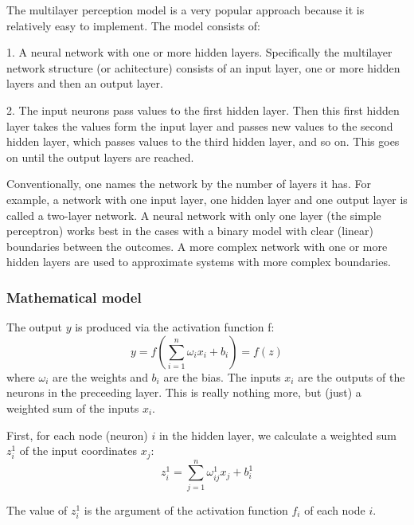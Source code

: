 \documentclass[a4paper,12pt]{article}
\begin{document}
The multilayer perception model is a very popular approach because it is relatively easy to implement. The model consists of:\newline

1. A neural network with one or more hidden layers. Specifically the multilayer network structure (or achitecture) consists of an input layer, one or more hidden layers and then an output layer.\newline

2. The input neurons pass values to the first hidden layer. Then this first hidden layer takes the values form the input layer and passes new values to the second hidden layer, which passes values to the third hidden layer, and so on. This goes on until the output layers are reached. \newline

Conventionally, one names the network by the number of layers it has. For example, a network with one input layer, one hidden layer and one output layer is called a two-layer network. A neural network with only one layer (the simple perceptron) works best in the cases with a binary model with clear (linear) boundaries between the outcomes. A more complex network with one or more hidden layers are used to approximate systems with more complex boundaries.

\subsubsection{Mathematical model}
The output $y$ is produced via the activation function f:
\begin{equation}
    y = f( \sum_{i=1}^n{\omega_i x_i + b_i} ) = f(z)
\end{equation}
where $\omega_i$ are the weights and $b_i$ are the bias. The inputs $x_i$ are the outputs of the neurons in the preceeding layer.\newline
This is really nothing more, but (just) a weighted sum of the inputs $x_i$.\newline

First, for each node (neuron) $i$ in the hidden layer, we calculate a weighted sum $z_i^1$ of the input coordinates $x_j$:
\begin{equation}
    z_i^1 = \sum_{j=1}^n \omega_{ij}^1 x_j + b_i^1
\end{equation}

The value of $z_i^1$ is the argument of the activation function $f_i$ of each node $i$.\newline
\end{document}
